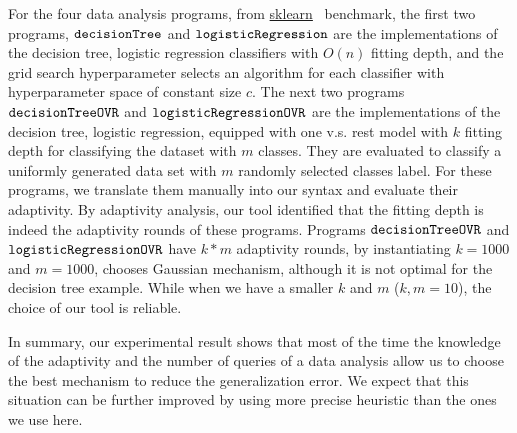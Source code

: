 For the four data analysis programs, 
from \hyperlink{https://github.com/scikit-learn/scikit-learn/tree/main/examples}{sklearn}~\cite{SklearnBenchmark} benchmark,
the first two programs, $\mathtt{decisionTree}$ and $\mathtt{logisticRegression}$ are
the
implementations of the decision tree, logistic regression classifiers
with $O(n)$ fitting depth,
and the grid search hyperparameter selects an algorithm for each classifier with 
hyperparameter space of constant size $c$.
The next two programs $\mathtt{decisionTreeOVR}$ and $\mathtt{logisticRegressionOVR}$ are
the implementations of the decision tree, logistic regression, equipped with one v.s. rest model with $k$ fitting depth for classifying the dataset with $m$ classes.
They are evaluated to classify a uniformly generated data set with $m$ randomly selected classes label. For these programs, we translate them manually into our syntax and evaluate their adaptivity.
By adaptivity analysis, our tool identified that the fitting depth is indeed the adaptivity rounds of these programs.
Programs $\mathtt{decisionTreeOVR}$ and $\mathtt{logisticRegressionOVR}$ 
have $k*m$ adaptivity rounds, by instantiating $k = 1000$ and $m = 1000$, {\THESYSTEM} chooses Gaussian mechanism, although it is not optimal for the decision tree example. While when we have a smaller $k$ and $m$ ($k,m=10$), the choice of our tool is reliable.


In summary, our experimental result shows that most of the time the knowledge of the adaptivity and the number of queries of a data analysis allow us to choose the best mechanism to  reduce the generalization error. We expect that this situation can be further improved by using more precise heuristic than the ones we use here. 



